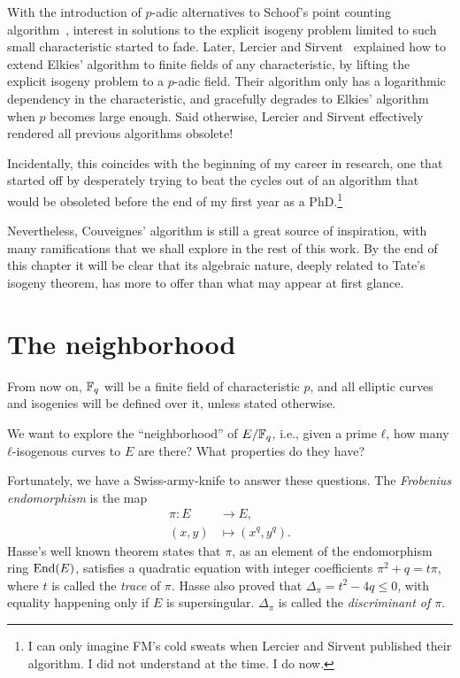 \documentclass{report}
\theoremstyle{plain}
\theoremstyle{definition}
\begin{document}
With the introduction of $p$-adic alternatives to Schoof's point
counting
algorithm~\cite{satoh00,kedlaya01,kedlaya04,lauder04,10.2307/24522768},
interest in solutions to the explicit isogeny problem limited to such
small characteristic started to fade. %
Later, Lercier and Sirvent~\cite{lercier+sirvent08} explained how to
extend Elkies' algorithm to finite fields of any characteristic, by
lifting the explicit isogeny problem to a $p$-adic field. %
Their algorithm only has a logarithmic dependency in the
characteristic, and gracefully degrades to Elkies' algorithm when $p$
becomes large enough. %
Said otherwise, Lercier and Sirvent effectively rendered all previous
algorithms obsolete! %

Incidentally, this coincides with the beginning of my career in
research, one that started off by desperately trying to beat the
cycles out of an algorithm that would be obsoleted before the end of
my first year as a PhD.\footnote{I can only imagine FM's cold sweats
  when Lercier and Sirvent published their algorithm. I did not
  understand at the time. I do now.}

Nevertheless, Couveignes' algorithm is still a great source of
inspiration, with many ramifications that we shall explore in the rest
of this work. %
By the end of this chapter it will be clear that its algebraic nature,
deeply related to Tate's isogeny theorem, has more to offer than what
may appear at first glance. %


\section{The neighborhood}

From now on, $\mathbb{F}_q$ will be a finite field of characteristic $p$, and
all elliptic curves and isogenies will be defined over it, unless
stated otherwise. %

We want to explore the ``neighborhood'' of $E/\mathbb{F}_q$, i.e., given a
prime $ℓ$, how many $ℓ$-isogenous curves to $E$ are there? What
properties do they have?

Fortunately, we have a Swiss-army-knife to answer these questions. %
The \emph{Frobenius endomorphism} is the map
\begin{equation*}
  \begin{aligned}
    π : E &→ E,\\
    (x,y) &↦ (x^q,y^q).
  \end{aligned}
\end{equation*}
Hasse's well known theorem states that $π$, as an element of the
endomorphism ring $\operatorname{End}(E)$, satisfies a quadratic equation with
integer coefficients $π^2 + q = tπ$, where $t$ is called the
\emph{trace} of $π$. %
Hasse also proved that $Δ_π=t^2-4q≤0$, with equality happening only if
$E$ is supersingular. %
$Δ_π$ is called the \emph{discriminant of $π$}. %
\end{document}

